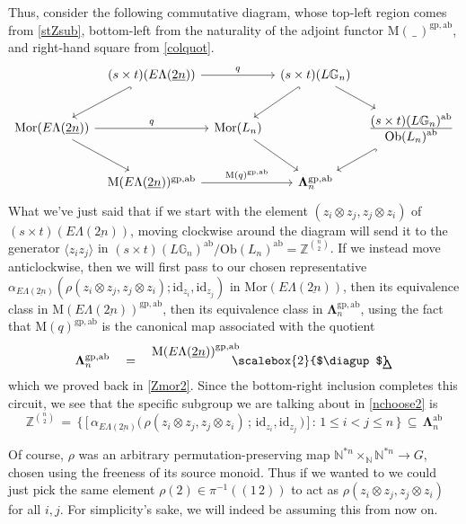 \documentclass{amsbook} %
\newcommand{\MLn}{\mathbf{\Lambda}_n}
\newcommand{\MorLn}{\mathrm{Mor}(L_n)}
\newcommand{\bigquotient}[2]{ \raisebox{0.75\height}{$#1$} \mkern-12mu\scalebox{2}{$\diagup$}\mkern-10mu \raisebox{-0.5\height}{$#2$} }
\newcommand{\ELnn}{E\Lambda(\underline{2n})}
\numberwithin{section}{chapter}
\begin{document}
Thus, consider the following commutative diagram, whose top-left region comes from \cref{stZsub}, bottom-left from the naturality of the adjoint functor $\mathrm{M}( \, \_ \, )^{\mathrm{gp},\mathrm{ab}}$, and right-hand square from \cref{colquot}.
\[ \begin{tikzcd}[column sep=tiny] 
& (s \times t)(\ELnn) \ar[dl, hookrightarrow] \ar[rr, "q"] & & (s \times t)(L\mathbb{G}_{n}) \ar[dl, hookrightarrow] \ar[dr] & \\
\mathrm{Mor}(\ELnn) \ar[rr, "q"] \ar[dr] & & \MorLn \ar[dr] & & \frac{\displaystyle (s \times t)(L\mathbb{G}_{n})^{\mathrm{ab}}}{\displaystyle \mathrm{Ob}(L_n)^{\mathrm{ab}}} \ar[dl, hookrightarrow] \\
& \mathrm{M}(\ELnn)^{\mathrm{gp},\mathrm{ab}} \ar[rr, "\mathrm{M}(q)^{\mathrm{gp},\mathrm{ab}}"] & & \MLn^{\mathrm{gp},\mathrm{ab}}
\end{tikzcd} \]
What we've just said that if we start with the element $(z_i \otimes z_j, z_j \otimes z_i)$ of $(s \times t)(\ELnn)$, moving clockwise around the diagram will send it to the generator $\langle z_i z_j \rangle$ in ${(s \times t)}(L\mathbb{G}_{n})^{\mathrm{ab}}/\mathrm{Ob}(L_n)^{\mathrm{ab}} = \mathbb{Z}^{{n}\choose{2}}$. If we instead move anticlockwise, then we will first pass to our chosen representative $\alpha_{\ELnn}(\rho(z_i \otimes z_j, z_j \otimes z_i); \mathrm{id}_{z_i}, \mathrm{id}_{z_j})$ in $\mathrm{Mor}(\ELnn)$, then its equivalence class in $\mathrm{M}(\ELnn)^{\mathrm{gp},\mathrm{ab}}$, then its equivalence class in $\MLn^{\mathrm{gp},\mathrm{ab}}$, using the fact that $\mathrm{M}(q)^{\mathrm{gp},\mathrm{ab}}$ is the canonical map associated with the quotient
\[ \MLn^{\mathrm{gp, ab}} \quad = \quad \bigquotient{{\mathrm{M}(\ELnn)}^{\mathrm{gp, ab}}}{\Delta} \]
which we proved back in \cref{Zmor2}. Since the bottom-right inclusion completes this circuit, we see that the specific subgroup we are talking about in \cref{nchoose2} is
\[ \mathbb{Z}^{{n}\choose{2}} \, = \, \big\{ \, \big[ \, \alpha_{\ELnn}\big( \, \rho(z_i \otimes z_j, z_j \otimes z_i) \, ; \,  \mathrm{id}_{z_i}, \mathrm{id}_{z_j} \, \big) \, \big] \, : \, 1 \le i < j \le n \, \big\} \, \subseteq \, \MLn^{\mathrm{ab}}\]

Of course, $\rho$ was an arbitrary permutation-preserving map $\mathbb{N}^{\ast n} \times_{\mathbb{N}} \mathbb{N}^{\ast n} \to G$, chosen using the freeness of its source monoid. Thus if we wanted to we could just pick the same element $\rho(2) \in \pi^{-1}((1 \, 2))$ to act as $\rho(z_i \otimes z_j, z_j \otimes z_i)$ for all $i, j$. For simplicity's sake, we will indeed be assuming this from now on.
\end{document}
